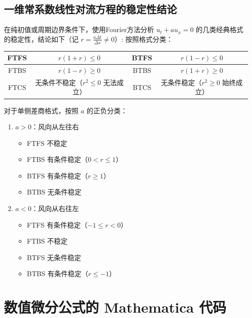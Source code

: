 \subsection*{一维常系数线性对流方程的稳定性结论}

在纯初值或周期边界条件下，使用Fourier方法分析 $u_t+au_x=0$ 的几类经典格式的稳定性，结论如下（记 $r = \frac{a\Delta t}{\Delta x} \neq 0$）:
按照格式分类：
\begin{table}[H]
    \centering
    \begin{tabular}{c|c|c|c}
        \hline
        FTFS & $r(1+r) \le 0$           & BTFS & $r(1-r) \le 0$          \\
        \hline
        FTBS & $r(1-r) \ge 0$           & BTBS & $r(1+r) \ge 0$          \\
        \hline
        FTCS & 无条件不稳定（$r^2 \le 0$ 无法成立） & BTCS & 无条件稳定（$r^2 \ge 0$ 始终成立） \\
        \hline
    \end{tabular}
\end{table}
对于单侧差商格式，按照 $a$ 的正负分类：
\begin{enumerate}
    \item $a>0$：风向从左往右
          \begin{itemize}
              \item FTFS 不稳定
              \item FTBS 有条件稳定（$0< r \le 1$）
              \item BTFS 有条件稳定（$r \ge 1$）
              \item BTBS 无条件稳定
          \end{itemize}
    \item $a<0$：风向从右往左
          \begin{itemize}
              \item FTFS 有条件稳定（$-1 \le r < 0$）
              \item FTBS 不稳定
              \item BTFS 无条件稳定
              \item BTBS 有条件稳定（$r \le -1$）
          \end{itemize}
\end{enumerate}

\section{数值微分公式的 Mathematica 代码}

